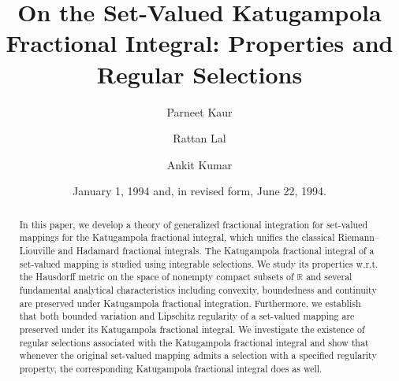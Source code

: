 \documentclass{amsproc}
\theoremstyle{definition}
\theoremstyle{remark}
\numberwithin{equation}{section}
\begin{document}
\title{On the Set-Valued Katugampola Fractional Integral: Properties and Regular Selections}



\author{Parneet Kaur}
\address{Department of Mathematics, 
Punjab Engineering college
(Deemed to be University), 
Sector 12 Chandigarh 160012, India}



\author{Rattan Lal}
\address{Department of Mathematics, 
Punjab Engineering college
(Deemed to be University), 
Sector 12 Chandigarh 160012, India}


\author{Ankit Kumar}
\address{Department of Mathematics, 
Punjab Engineering college
(Deemed to be University), 
Sector 12 Chandigarh 160012, India}




\date{January 1, 1994 and, in revised form, June 22, 1994.}



\begin{abstract}
In this paper, we develop a theory of generalized fractional integration for set-valued mappings for the Katugampola fractional integral, which unifies the classical Riemann–Liouville and Hadamard fractional integrals. The Katugampola fractional integral of a set-valued mapping is studied using integrable selections.  We study its properties w.r.t. the Hausdorff metric on the space of nonempty compact subsets of $\mathbb{R}$ and several fundamental analytical characteristics including convexity, boundedness and continuity are preserved under Katugampola fractional integration. Furthermore, we establish that both bounded variation and Lipschitz regularity of a set-valued mapping are preserved under its Katugampola fractional integral. We investigate the existence of regular selections associated with the Katugampola fractional integral and show that whenever the original set-valued mapping admits a selection with a specified regularity property, the corresponding Katugampola fractional integral does as well. 
\end{abstract}
\end{document}
